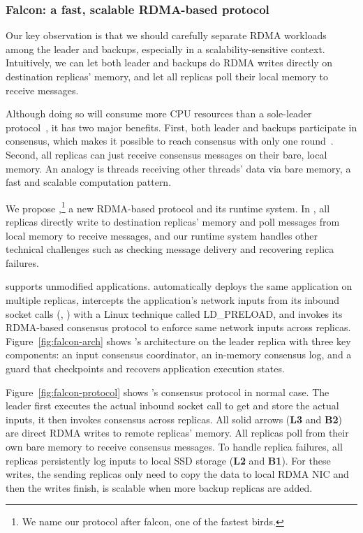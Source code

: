 \vspace{-.15in}\subsubsection{Falcon: a fast, scalable RDMA-based \paxos 
protocol} 
\label{sec:falcon}\vspace{-.075in}

Our key observation is that we should carefully separate RDMA workloads among
the leader and backups, especially in a scalability-sensitive context. 
Intuitively, we can let both leader and backups do RDMA writes directly on 
destination replicas' memory, and let all replicas poll their local memory to 
receive messages.

Although doing so will consume more CPU resources than a sole-leader 
protocol~\cite{dare:hpdc15}, it has two major benefits. First, both leader and 
backups participate in consensus, which makes it possible to reach consensus 
with only one round~\cite{paxos:practical}. Second, all replicas can just 
receive consensus messages on their bare, local memory. An analogy is threads 
receiving other threads' data via bare memory, a fast and scalable computation 
pattern.

We propose \falcon,\footnote{We name our protocol after
falcon, one of the fastest birds.} a new RDMA-based \paxos protocol and its
runtime system. In \xxx, all replicas directly write to destination
replicas' memory and poll messages from local memory to receive messages, and 
our runtime system handles other technical challenges such as checking message 
delivery and recovering replica failures.

\falcon supports unmodified applications. \falcon automatically deploys the 
same application on multiple replicas, intercepts the application's 
network inputs from its inbound socket calls (\eg, \recv) with a Linux 
technique called LD\_PRELOAD, and invokes its RDMA-based consensus protocol to 
enforce same network inputs across replicas. Figure~\ref{fig:falcon-arch} 
shows \falcon's architecture on the leader replica with three key components: 
an input consensus coordinator, an in-memory consensus log, and a guard that 
checkpoints and recovers application execution states.

Figure~\ref{fig:falcon-protocol} shows \falcon's consensus protocol in normal 
case. The leader first executes the actual inbound socket call to get and store 
the actual inputs, it then invokes consensus across replicas. All 
solid arrows (\textbf{L3} and \textbf{B2}) are direct RDMA writes to remote 
replicas' memory. All replicas poll from their own bare memory to receive 
consensus messages. To handle replica failures, all replicas persistently log 
inputs to local SSD storage (\textbf{L2} and \textbf{B1}). For these writes, 
the sending replicas only need to copy the data to local RDMA NIC and then the 
writes finish, \falcon is scalable when more backup replicas are added.

